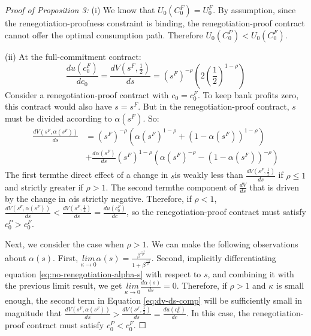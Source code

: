 \documentclass[11pt,english]{article}
\theoremstyle{plain}
\theoremstyle{definition}
\begin{document}
\emph{Proof of Proposition 3:} (i) We know that $U_{0}\left(C_{0}^{F}\right)=U_{0}^{F}$.
By assumption, since the renegotiation-proofness constraint is binding,
the renegotiation-proof contract cannot offer the optimal consumption
path. Therefore $U_{0}\left(C_{0}^{P}\right)<U_{0}\left(C_{0}^{F}\right)$.

(ii) At the full-commitment contract: 
\begin{equation}
\frac{du\left(c_{0}^{F}\right)}{dc_{0}}=\frac{dV\left(s^{F},\frac{1}{2}\right)}{ds}=\left(s^{F}\right)^{-\rho}\left(2\left(\frac{1}{2}\right)^{1-\rho}\right)
\end{equation}
Consider a renegotiation-proof contract with $c_{0}=c_{0}^{F}$. To
keep bank profits zero, this contract would also have $s=s^{F}$.
But in the renegotiation-proof contract, $s$ must be divided according
to $\alpha\left(s^{F}\right)$. So: 
\begin{align}
\frac{dV\left(s^{F},\alpha\left(s^{F}\right)\right)}{ds} & =\left(s^{F}\right)^{-\rho}\left(\alpha\left(s^{F}\right)^{1-\rho}+\left(1-\alpha\left(s^{F}\right)\right)^{1-\rho}\right)\nonumber \\
 & +\frac{d\alpha\left(s^{F}\right)}{ds}\left(s^{F}\right)^{1-\rho}\left(\alpha\left(s^{F}\right)^{-\rho}-\left(1-\alpha\left(s^{F}\right)\right)^{-\rho}\right)\label{eq:dv-ds-comp}
\end{align}
The first term\textendash the direct effect of a change in $s$\textendash is
weakly less than $\frac{dV\left(s^{F},\frac{1}{2}\right)}{ds}$ if
$\rho\leq1$ and strictly greater if $\rho>1$. The second term\textendash the
component of $\frac{dV}{ds}$ that is driven by the change in $\alpha$\textendash is
strictly negative. Therefore, if $\rho<1$, $\frac{dV\left(s^{F},\alpha\left(s^{F}\right)\right)}{ds}<\frac{dV\left(s^{F},\frac{1}{2}\right)}{ds}=\frac{du\left(c_{0}^{F}\right)}{dc}$,
so the renegotiation-proof contract must satisfy $c_{0}^{P}>c_{0}^{F}$.

Next, we consider the case when $\rho>1$. We can make the following
observations about $\alpha\left(s\right)$. First, $\underset{\kappa\rightarrow0}{lim}\alpha\left(s\right)=\frac{\beta^{\frac{-1}{\rho}}}{1+\beta^{\frac{-1}{\rho}}}$.
Second, implicitly differentiating equation \ref{eq:no-renegotiation-alpha-s}
with respect to $s$, and combining it with the previous limit result,
we get $\underset{\kappa\rightarrow0}{lim}\frac{d\alpha\left(s\right)}{ds}=0$.
Therefore, if $\rho>1$ and $\kappa$ is small enough, the second
term in Equation \ref{eq:dv-ds-comp} will be sufficiently small in
magnitude that $\frac{dV\left(s^{F},\alpha\left(s^{F}\right)\right)}{ds}>\frac{dV\left(s^{F},\frac{1}{2}\right)}{ds}=\frac{du\left(c_{0}^{F}\right)}{dc}$.
In this case, the renegotiation-proof contract must satisfy $c_{0}^{P}<c_{0}^{F}$.
$\Square$
\end{document}
